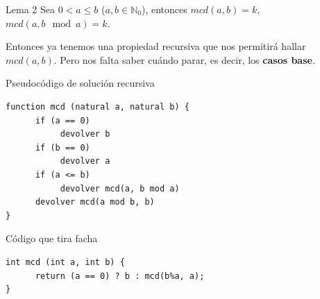 \documentclass[compress]{beamer}
\begin{document}
\begin{frame}
\begin{block}{Lema 2}
	Sea $0 < a \leq b$ ($a, b \in \mathbb{N}_0$), entonces $mcd(a, b) = k$, $mcd(a, b \mod{a}) = k$.
\end{block}
\pause
{}
\end{frame}

\begin{frame}
Entonces ya tenemos una propiedad recursiva que nos permitir\'a hallar $mcd(a,b)$. Pero nos falta saber cu\'ando parar, es decir, los \textbf{casos base}. \\ \bigskip
\pause
{}
\end{frame}

\begin{frame}[fragile]{Pseudoc\'odigo de soluci\'on recursiva}
\begin{verbatim}
function mcd (natural a, natural b) {
      if (a == 0)
           devolver b
      if (b == 0)
           devolver a
      if (a <= b)
           devolver mcd(a, b mod a)
      devolver mcd(a mod b, b)
}
\end{verbatim}
\end{frame}

\begin{frame}[fragile]{C\'odigo que tira facha}
\begin{verbatim}
int mcd (int a, int b) {
      return (a == 0) ? b : mcd(b%a, a);
}
\end{verbatim}
\end{frame}
\end{document}
